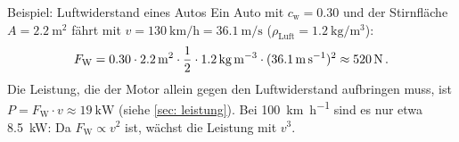 \begin{examplebox}[]{Beispiel: Luftwiderstand eines Autos}
    Ein Auto mit $c_\text{w} = \num{0.30}$ und der Stirnfläche $A = \SI{2.2}{\meter\squared}$ fährt mit $v = \SI{130}{\kilo\meter\per\hour} = \SI{36.1}{\meter\per\second}$ ($\rho_\text{Luft} = \SI{1.2}{\kilogram\per\meter\cubed}$):
    \begin{equation*}
        F_\text{W} = \num{0.30} \cdot \SI{2.2}{\meter\squared} \cdot \frac{1}{2} \cdot \SI{1.2}{\kilogram\per\meter\cubed} \cdot (\SI{36.1}{\meter\per\second})^2 \approx \SI{520}{\newton} \,.
    \end{equation*}
    Die Leistung, die der Motor allein gegen den Luftwiderstand aufbringen muss, ist $P = F_\text{W} \cdot v \approx \SI{19}{\kilo\watt}$ (siehe \cref{sec: leistung}). Bei \SI{100}{\kilo\meter\per\hour} sind es nur etwa \SI{8.5}{\kilo\watt}: Da $F_\text{W} \propto v^2$ ist, wächst die Leistung mit $v^3$.
\end{examplebox}

\newpage
